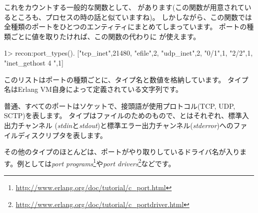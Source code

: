 これをカウントする一般的な関数として、 があります(この関数が用意されているところも、プロセスの時の話と似ていますね)。
しかしながら、この関数では全種類のポートをひとつのエンティティにまとめてしまっています。
ポートの種類ごとに値を取りたければ、この関数の代わりに  が使えます。


\begin{VerbatimEshell}
1> recon:port_types().
[{"tcp_inet",21480},
 {"efile",2},
 {"udp_inet",2},
 {"0/1",1},
 {"2/2",1},
 {"inet_gethost 4 ",1}]
 \end{VerbatimEshell}

このリストはポートの種類ごとに、タイプ名と数値を格納しています。
タイプ名はErlang VM自身によって定義されている文字列です。

普通、すべてのポートはソケットで、接頭語が使用プロトコル(TCP, UDP, SCTP)を表します。
タイプはファイルのためのもので、とはそれぞれ、標準入出力チャンネル (\emph{stdin}と\emph{stdout})と標準エラー出力チャンネル(\emph{stderror})へのファイルディスクリプタを表します。

その他のタイプのほとんどは、ポートがやり取りしているドライバ名が入ります。例としては\emph{port programs}\footnote{\href{http://www.erlang.org/doc/tutorial/c\_port.html}{http://www.erlang.org/doc/tutorial/c\_port.html}}や\emph{port drivers}\footnote{\href{http://www.erlang.org/doc/tutorial/c\_portdriver.html}{http://www.erlang.org/doc/tutorial/c\_portdriver.html}}などです。

